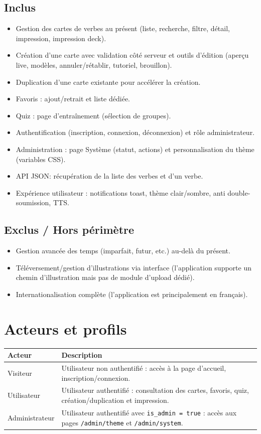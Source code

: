 \documentclass[12pt,a4paper]{article}
\begin{document}
\subsection{Inclus}
\begin{itemize}[leftmargin=*]
  \item Gestion des cartes de verbes au présent (liste, recherche, filtre, détail, impression, impression deck).
  \item Création d'une carte avec validation côté serveur et outils d'édition (aperçu live, modèles, annuler/rétablir, tutoriel, brouillon).
  \item Duplication d'une carte existante pour accélérer la création.
  \item Favoris : ajout/retrait et liste dédiée.
  \item Quiz : page d'entraînement (sélection de groupes).
  \item Authentification (inscription, connexion, déconnexion) et rôle administrateur.
  \item Administration : page Système (statut, actions) et personnalisation du thème (variables CSS).
  \item API JSON: récupération de la liste des verbes et d'un verbe.
  \item Expérience utilisateur : notifications toast, thème clair/sombre, anti double-soumission, TTS.
\end{itemize}

\subsection{Exclus / Hors périmètre}
\begin{itemize}[leftmargin=*]
  \item Gestion avancée des temps (imparfait, futur, etc.) au-delà du présent.
  \item Téléversement/gestion d'illustrations via interface (l'application supporte un chemin d'illustration mais pas de module d'upload dédié).
  \item Internationalisation complète (l'application est principalement en français).
\end{itemize}

\section{Acteurs et profils}
\begin{longtable}{@{}p{3.5cm}p{11cm}@{}}
\toprule
\textbf{Acteur} & \textbf{Description} \\
\midrule
\endhead
Visiteur & Utilisateur non authentifié : accès à la page d'accueil, inscription/connexion. \\
Utilisateur & Utilisateur authentifié : consultation des cartes, favoris, quiz, création/duplication et impression. \\
Administrateur & Utilisateur authentifié avec \texttt{is\_admin = true} : accès aux pages \texttt{/admin/theme} et \texttt{/admin/system}. \\
\bottomrule
\end{longtable}
\end{document}
